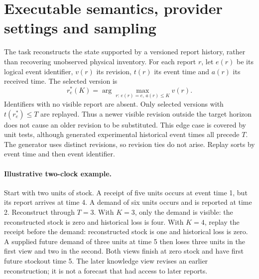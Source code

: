 \appendix
\section{Executable semantics, provider settings and sampling}
\label{app:semantics}
The task reconstructs the state supported by a versioned report history, rather
than recovering unobserved physical inventory. For each report $r$, let $e(r)$ be
its logical event identifier, $v(r)$ its revision, $t(r)$ its event time and
$a(r)$ its received time. The selected version is
\[
 r_e^*(K)=\arg\max_{r:\,e(r)=e,\,a(r)\leq K} v(r).
\]
Identifiers with no visible report are absent. Only selected versions with
$t(r_e^*)\leq T$ are replayed. Thus a newer visible revision outside the target
horizon does not cause an older revision to be substituted. This edge case is
covered by unit tests, although generated experimental historical event times
all precede $T$. The generator uses distinct revisions, so revision ties do not
arise. Replay sorts by event time and then event identifier.

\paragraph{Illustrative two-clock example.}
Start with two units of stock. A receipt of five units occurs at event time 1,
but its report arrives at time 4. A demand of six units occurs and is reported
at time 2. Reconstruct through $T=3$. With $K=3$, only the demand is visible:
the reconstructed stock is zero and historical loss is four. With $K=4$, replay
the receipt before the demand: reconstructed stock is one and historical loss
is zero. A supplied future demand of three units at time 5 then loses three
units in the first view and two in the second. Both views finish at zero stock
and have first future stockout time 5. The later knowledge view revises an
earlier reconstruction; it is not a forecast that had access to later reports.

